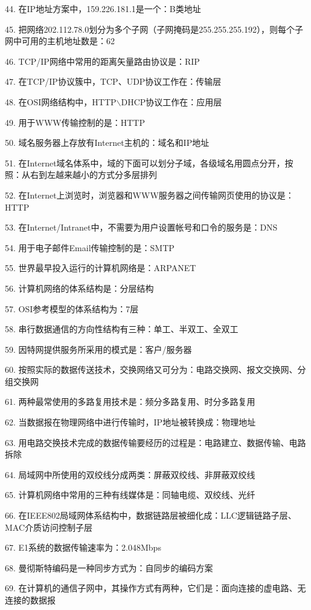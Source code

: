 \documentclass[fleqn]{article}
\begin{document}
44. 在IP地址方案中，159.226.181.1是一个：B类地址

45. 把网络202.112.78.0划分为多个子网（子网掩码是255.255.255.192），则每个子网中可用的主机地址数是：62

46. TCP/IP网络中常用的距离矢量路由协议是：RIP

47. 在TCP/IP协议簇中，TCP、UDP协议工作在：传输层

48. 在OSI网络结构中，HTTP$\backslash$DHCP协议工作在：应用层

49. 用于WWW传输控制的是：HTTP

50. 域名服务器上存放有Internet主机的：域名和IP地址

51. 在Internet域名体系中，域的下面可以划分子域，各级域名用圆点分开，按照：从右到左越来越小的方式分多层排列

52. 在Internet上浏览时，浏览器和WWW服务器之间传输网页使用的协议是：HTTP

53. 在Internet/Intranet中，不需要为用户设置帐号和口令的服务是：DNS

54. 用于电子邮件Email传输控制的是：SMTP

55. 世界最早投入运行的计算机网络是：ARPANET

56. 计算机网络的体系结构是：分层结构

57. OSI参考模型的体系结构为：7层

58. 串行数据通信的方向性结构有三种：单工、半双工、全双工

59. 因特网提供服务所采用的模式是：客户/服务器

60. 按照实际的数据传送技术，交换网络又可分为：电路交换网、报文交换网、分组交换网

61. 两种最常使用的多路复用技术是：频分多路复用、时分多路复用

62. 当数据报在物理网络中进行传输时，IP地址被转换成：物理地址

63. 用电路交换技术完成的数据传输要经历的过程是：电路建立、数据传输、电路拆除

64. 局域网中所使用的双绞线分成两类：屏蔽双绞线、非屏蔽双绞线

65. 计算机网络中常用的三种有线媒体是：同轴电缆、双绞线、光纤

66. 在IEEE802局域网体系结构中，数据链路层被细化成：LLC逻辑链路子层、MAC介质访问控制子层

67. E1系统的数据传输速率为：2.048Mbps

68. 曼彻斯特编码是一种同步方式为：自同步的编码方案

69. 在计算机的通信子网中，其操作方式有两种，它们是：面向连接的虚电路、无连接的数据报
\end{document}
